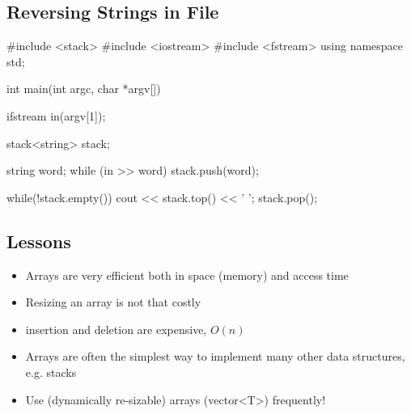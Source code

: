 
\begin{slide}
\section[-1]{Reversing Strings in File}

\begin{cpp}
#include <stack>
#include <iostream>
#include <fstream>
using namespace std;

int main(int argc, char *argv[]) {
  ifstream in(argv[1]);

  stack<string> stack;

  string word;
  while (in >> word)
    stack.push(word);

  while(!stack.empty()) {
      cout << stack.top() << ' ';
      stack.pop();
  }
}
\end{cpp}
\end{slide}


\begin{slide}
\section{Lessons}

\begin{PauseHighLight}
  \begin{itemize}
  \item Arrays are very efficient both in space (memory) and access
    time\pause
  \item Resizing an array is not that costly\pause
  \item insertion and deletion are expensive, $O(n)$\pause
  \item Arrays are often the simplest way to implement many other
    data structures, e.g. stacks\pause
  \item Use (dynamically re-sizable) arrays (vector<T>) frequently!\pause
  \end{itemize}
\end{PauseHighLight}

\end{slide}
